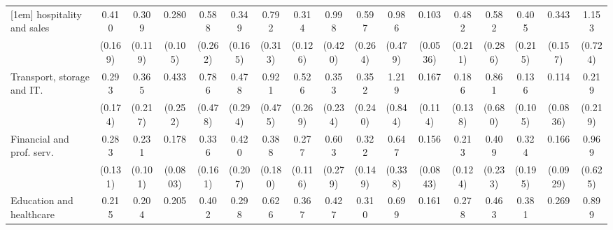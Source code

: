 {\begin{tabular}{l*{16}{c}}
[1em]
hospitality and sales&       0.410\sym{*}  &       0.309\sym{**} &       0.280\sym{***}&       0.588         &       0.349\sym{*}  &       0.792         &       0.314\sym{**} &       0.998         &       0.597         &       0.986         &       0.103\sym{***}&       0.482         &       0.582         &       0.405         &       0.343\sym{*}  &       1.153         \\
                    &     (0.169)         &     (0.119)         &     (0.105)         &     (0.262)         &     (0.165)         &     (0.313)         &     (0.126)         &     (0.420)         &     (0.264)         &     (0.479)         &    (0.0536)         &     (0.211)         &     (0.286)         &     (0.215)         &     (0.157)         &     (0.724)         \\
[1em]
Transport, storage and IT.&       0.293\sym{*}  &       0.365         &       0.433         &       0.786         &       0.478         &       0.921         &       0.526         &       0.353         &       0.352         &       1.219         &       0.167\sym{**} &       0.186\sym{*}  &       0.861         &       0.136\sym{*}  &       0.114\sym{**} &       0.219         \\
                    &     (0.174)         &     (0.217)         &     (0.252)         &     (0.478)         &     (0.294)         &     (0.475)         &     (0.269)         &     (0.234)         &     (0.240)         &     (0.844)         &     (0.114)         &     (0.138)         &     (0.680)         &     (0.105)         &    (0.0836)         &     (0.219)         \\
[1em]
Financial and prof. serv.&       0.283\sym{**} &       0.231\sym{***}&       0.178\sym{***}&       0.336\sym{*}  &       0.420         &       0.388\sym{*}  &       0.277\sym{**} &       0.603         &       0.322\sym{*}  &       0.647         &       0.156\sym{***}&       0.213\sym{**} &       0.409         &       0.324         &       0.166\sym{**} &       0.969         \\
                    &     (0.131)         &     (0.101)         &    (0.0803)         &     (0.161)         &     (0.207)         &     (0.180)         &     (0.116)         &     (0.279)         &     (0.149)         &     (0.338)         &    (0.0843)         &     (0.124)         &     (0.233)         &     (0.195)         &    (0.0929)         &     (0.625)         \\
[1em]
Education and healthcare&       0.215\sym{***}&       0.204\sym{***}&       0.205\sym{***}&       0.402\sym{*}  &       0.298\sym{*}  &       0.626         &       0.367\sym{*}  &       0.427         &       0.310\sym{*}  &       0.699         &       0.161\sym{***}&       0.278\sym{*}  &       0.463         &       0.381         &       0.269\sym{*}  &       0.899         \\

\end{tabular}}
